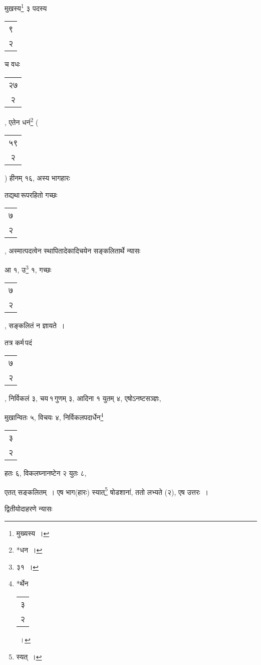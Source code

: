 \documentclass[10pt, openany]{book}
\begin{document}
{{{{{{{{\newpage

{मुखस्य\renewcommand{\thefootnote}{१}\footnote{मुख्यस्य~।} ३ पदस्य\begin{tabular}{c}९\\ २\end{tabular}च वधः\begin{tabular}{c}२७\\ २\end{tabular}, एतेन धनं\renewcommand{\thefootnote}{२}\footnote{*धन~।} \bigg(\begin{tabular}{c}५९\\ २\end{tabular}\bigg) हीनम् १६,
अस्य भागहारः}
{तद्यथा\textendash \,रूपरहितो गच्छः\begin{tabular}{c}७ \\२\end{tabular}, अस्मात्पदत्वेन स्थापितादेकादिचयेन
सङ्कलितार्थे न्यासः\textendash}
\vspace{2mm}
    
\hspace{1cm} {आ १, उ\renewcommand{\thefootnote}{३}\footnote{३१~।} १, गच्छः\begin{tabular}{c}७ \\२\end{tabular}, सङ्कलितं न ज्ञायते~।}
\vspace{3mm}

{तत्र कर्म\textendash \,पदं\begin{tabular}{c}७\\ २\end{tabular}, निर्विकलं ३, चय\textendash \,१\textendash \,गुणम् ३, आदिना १ युतम् ४,
एषोऽनष्टसञ्ज्ञः,}
{मुखान्वितः ५, विचयः ४, निर्विकलपदार्धेन\renewcommand{\thefootnote}{४}\footnote{*र्थेन \begin{tabular}{c|}३ \\२\\\hline \end{tabular}~।}\,\begin{tabular}{c|}३ \\२\\\hline \end{tabular} हतः ६, विकलघ्नानष्टेन
२ युतः ८,}
{एतत् सङ्कलितम्~। एष भाग(हारः) स्यात्\renewcommand{\thefootnote}{५}\footnote{स्यत्~।} षोडशानां, ततो लभ्यते (२), एष
उत्तरः~।}
\vspace{3mm}

{द्वितीयोदाहरणे न्यासः\textendash}
\vspace{2mm}

\vspace{3mm}

}}}}}}}}
\end{document}
